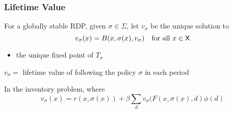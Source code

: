 \begin{frame}
    \frametitle{Lifetime Value}

    For a globally stable RDP, given $\sigma \in \Sigma$, let
    $v_\sigma$ be the unique solution to
    \begin{equation*}
        v_\sigma(x) = B(x, \sigma(x), v_\sigma)
        \quad \text{for all } x \in \mathsf X
    \end{equation*}

    \begin{itemize}
        \item the unique fixed point of $T_\sigma$ 
    \end{itemize}


     $v_\sigma =$ lifetime value of following the
    policy $\sigma$ in each period 

    \Eg In the inventory problem, where
    \begin{equation*}
        v_\sigma(x)
        = r(x, \sigma(x))
                + \beta
                \sum_d v_\sigma (F(x, \sigma(x), d) \phi(d)
    \end{equation*}

\end{frame}


\begin{frame}
    

\end{frame}











